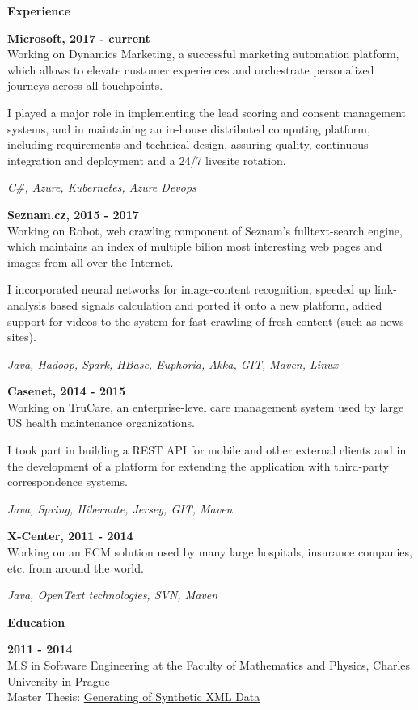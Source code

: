 \documentclass[a4paper,11pt,final]{memoir}
\newcommand{\Sep}{\vspace{1.4em}}
\newcommand{\SmallSep}{\vspace{0.7em}}
\newcommand{\CVSection}[1]
	{\Large\textbf{#1}\par
	\SmallSep\normalsize\normalfont}
\newcommand{\CVItem}[1]
	{\textbf{\color{RoyalBlue} #1}}
\begin{document}
\CVSection{Experience}

\CVItem{Microsoft, 2017 - current}\\
Working on Dynamics Marketing, a successful marketing automation platform, which allows to elevate customer experiences and orchestrate personalized journeys across all touchpoints.

I played a major role in implementing the lead scoring and consent management systems, and in maintaining an in-house distributed computing platform, including requirements and technical design, assuring quality, continuous integration and deployment and a 24/7 livesite rotation.

\vspace{0.2em}
\textit{C\#, Azure, Kubernetes, Azure Devops}
\SmallSep

\CVItem{Seznam.cz, 2015 - 2017}\\
Working on Robot, web crawling component of Seznam's fulltext-search engine, which maintains an index of multiple bilion most interesting web pages and images from all over the Internet.

I incorporated neural networks for image-content recognition, speeded
up link-analysis based signals calculation and ported it onto a new
platform, added support for videos to the system for fast crawling
of fresh content (such as news-sites).

\vspace{0.2em}
\textit{Java, Hadoop, Spark, HBase, Euphoria, Akka, GIT, Maven, Linux}
\SmallSep

\CVItem{Casenet, 2014 - 2015}\\
Working on TruCare, an enterprise-level care management system used
by large US health maintenance organizations.

I took part in building a REST API for mobile and other external clients
and in the development of a platform for extending the application with
third-party correspondence systems.

\vspace{0.2em}
\textit{Java, Spring, Hibernate, Jersey, GIT, Maven}
\SmallSep

\CVItem{X-Center, 2011 - 2014}\\
Working on an ECM solution used by many large hospitals, insurance companies, etc. from around the world.

\vspace{0.2em}
\textit{Java, OpenText technologies, SVN, Maven}
\Sep

\CVSection{Education}
\CVItem{2011 - 2014}\\
M.S in Software Engineering at the Faculty of Mathematics and Physics, Charles University in Prague\\
\SmallSep
Master Thesis: \href{http://www.dusanrychnovsky.cz/files/master-thesis.pdf}{Generating of Synthetic XML Data}
\SmallSep
\end{document}
